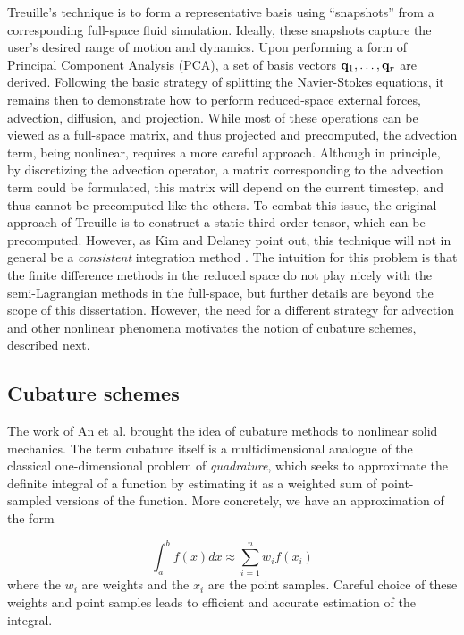 Treuille's technique is to form a representative basis using ``snapshots'' from a corresponding full-space fluid simulation. Ideally, these snapshots capture the 
user's desired range of motion and dynamics. Upon performing a form of Principal Component Analysis (PCA), a set of basis vectors $\mathbf{q}_1, \dots, \mathbf{q}_r$ are derived. Following the basic strategy of splitting the Navier-Stokes equations, it remains then to demonstrate how to perform reduced-space external forces,
advection, diffusion, and projection. While most of these operations can be viewed as a full-space matrix, and thus projected and precomputed, the advection
term, being nonlinear, requires a more careful approach. Although in principle, by discretizing the advection operator, a matrix corresponding
to the advection term could be formulated, this matrix will depend on the current timestep, and thus cannot be precomputed like the others. To combat this issue,
the original approach of Treuille is to construct a static third order tensor, which can be precomputed. However, as Kim and Delaney point out, this technique
will not in general be a {\em consistent} integration method \cite{Kim2013, Carlberg11}. The intuition for this problem is that the finite difference methods in the reduced space do not play nicely with the semi-Lagrangian methods in the full-space, but further details are beyond the scope of this dissertation. However, the need for a different strategy for advection and other nonlinear phenomena motivates the notion of cubature schemes, described next.

\subsection{Cubature schemes}
The work of An et al. \cite{An:2008} brought the idea of cubature methods to nonlinear solid mechanics. The term cubature itself is a multidimensional analogue
of the classical one-dimensional problem of {\em quadrature}, which seeks to approximate the definite integral of a function by estimating it as a weighted 
sum of point-sampled versions of the function. More concretely, we have an approximation of the form

\begin{equation}
\int_a^b f(x) dx \approx \sum_{i=1}^n w_i f(x_i)
\end{equation}
where the $w_i$ are weights and the $x_i$ are the point samples. Careful choice of these weights and point samples leads to efficient and accurate estimation of the integral.



